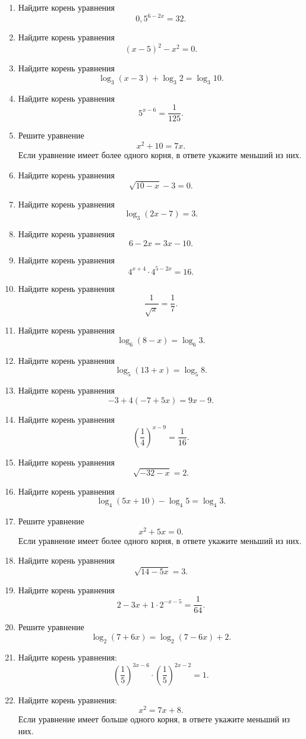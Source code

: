 \begin{enumerate}
  Решите уравнение \[\sqrt[5]{5x + 11} = 4.\]
\item
  Найдите корень уравнения \[0,5^{6 - 2x} = 32.\]
\item
  Найдите корень уравнения \[(x - 5)^2 - x^2 = 0.\]
\item
  Найдите корень уравнения \[\log_{3}(x - 3) + \log_{3}2 = \log_{3}10.\]
\item
  Найдите корень уравнения \[5^{x - 6} = \frac{1}{125}.\]
\item
  Решите уравнение \[x^2 + 10 = 7x.\] Если уравнение имеет более одного
  корня, в ответе укажите меньший из них.
\item
  Найдите корень уравнения \[\sqrt{10 - x} - 3 = 0.\]
\item
  Найдите корень уравнения \[\log_{3}(2x - 7) = 3.\]
\item
  Найдите корень уравнения \[6 - 2x = 3x - 10.\]
\item
  Найдите корень уравнения \[4^{x + 4} \cdot 4^{5 - 2x} = 16.\]
\item
  Найдите корень уравнения \[\frac{1}{\sqrt{x}} = \frac{1}{7}.\]
\item
  Найдите корень уравнения \[\log_{6}(8 - x) = \log_{6}3.\]
\item
  Найдите корень уравнения \[\log_{5}(13 + x) = \log_{5}8.\]
\item
  Найдите корень уравнения \[-3 + 4(-7 + 5x) = 9x - 9.\]
\item
  Найдите корень уравнения
  \[\left(\frac{1}{4}\right)^{x - 9} = \frac{1}{16}.\]
\item
  Найдите корень уравнения \[\sqrt{-32 - x} = 2.\]
\item
  Найдите корень уравнения
  \[\log_{4}(5x + 10) - \log_{4}5 = \log_{4}3.\]
\item
  Решите уравнение \[x^2 + 5x = 0.\] Если уравнение имеет более одного
  корня, в ответе укажите меньший из них.
\item
  Найдите корень уравнения \[\sqrt{14 - 5x} = 3.\]
\item
  Найдите корень уравнения
  \[2 - 3x + 1 \cdot 2^{- x - 5} = \frac{1}{64}.\]
\item
  Решите уравнение \[\log_{2}(7 + 6x) = \log_{2}(7 - 6x) + 2.\]
\item
  Найдите корень уравнения:
  \[\left(\frac{1}{5}\right)^{3x - 6} \cdot \left(\frac{1}{5}\right)^{2x - 2} = 1.\]
\item
  Найдите корень уравнения: \[x^2 = 7x + 8.\] Если уравнение имеет
  больше одного корня, в ответе укажите меньший из них.

\end{enumerate}
